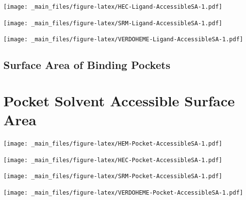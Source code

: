 \documentclass[a4paper, nobind]{templates/ociamthesis}
\let\origfigure\figure
\let\endorigfigure\endfigure
\renewenvironment{figure}[1][2] {
    \expandafter\origfigure\expandafter[H]
} {
    \endorigfigure
}
\begin{document}
\begin{figure}
\centering
\texttt{[image: \_main\_files/figure-latex/HEC-Ligand-AccessibleSA-1.pdf]}
\caption{\label{fig:HEC-Ligand-AccessibleSA}HEC: Ligand Accessible Surface Area}
\end{figure}

\begin{figure}
\centering
\texttt{[image: \_main\_files/figure-latex/SRM-Ligand-AccessibleSA-1.pdf]}
\caption{\label{fig:SRM-Ligand-AccessibleSA}SRM: Ligand Accessible Surface Area}
\end{figure}

\begin{figure}
\centering
\texttt{[image: \_main\_files/figure-latex/VERDOHEME-Ligand-AccessibleSA-1.pdf]}
\caption{\label{fig:VERDOHEME-Ligand-AccessibleSA}VERDOHEME: Ligand Accessible Surface Area}
\end{figure}

\hypertarget{surface-area-of-binding-pockets}{%
\subsection{Surface Area of Binding Pockets}\label{surface-area-of-binding-pockets}}

\hypertarget{figs-pocketAccSA}{%
\section{Pocket Solvent Accessible Surface Area}\label{figs-pocketAccSA}}

\begin{figure}
\centering
\texttt{[image: \_main\_files/figure-latex/HEM-Pocket-AccessibleSA-1.pdf]}
\caption{\label{fig:HEM-Pocket-AccessibleSA}HEM: Pocket Accessible Surface Area}
\end{figure}

\begin{figure}
\centering
\texttt{[image: \_main\_files/figure-latex/HEC-Pocket-AccessibleSA-1.pdf]}
\caption{\label{fig:HEC-Pocket-AccessibleSA}HEC: Pocket Accessible Surface Area}
\end{figure}

\begin{figure}
\centering
\texttt{[image: \_main\_files/figure-latex/SRM-Pocket-AccessibleSA-1.pdf]}
\caption{\label{fig:SRM-Pocket-AccessibleSA}SRM: Pocket Accessible Surface Area}
\end{figure}

\begin{figure}
\centering
\texttt{[image: \_main\_files/figure-latex/VERDOHEME-Pocket-AccessibleSA-1.pdf]}
\caption{\label{fig:VERDOHEME-Pocket-AccessibleSA}VERDOHEME: Pocket Accessible Surface Area}
\end{figure}
\end{document}
